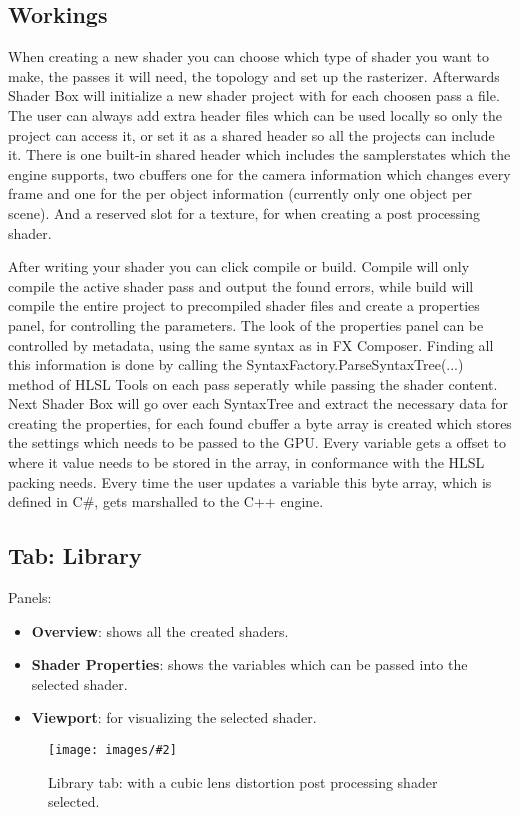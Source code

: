 \documentclass{paper}
\newlength{\imgwidth} %
\newcommand\scalegraphics[3][]
{
	\begin{figure}[H]
	\centering
	\settowidth{\imgwidth}{\texttt{[image: images/\#2]}} %
	\setlength{\imgwidth}{\minof{#1\imgwidth}{\textwidth}} %
	\texttt{[image: images/\#2]} %
	\caption{#3}
	\end{figure}
}
\begin{document}
\newpage
\subsection{Workings}
When creating a new shader you can choose which type of shader you want to make, the passes it will need, the topology and set up the rasterizer. Afterwards Shader Box will initialize a new shader project with for each choosen pass a file. The user can always add extra header files which can be used locally so only the project can access it, or set it as a shared header so all the projects can include it. There is one built-in shared header which includes the samplerstates which the engine supports, two cbuffers one for the camera information which changes every frame and one for the per object information (currently only one object per scene). And a reserved slot for a texture, for when creating a post processing shader.
\par
After writing your shader you can click compile or build. Compile will only compile the active shader pass and output the found errors, while build will compile the entire project to precompiled shader files and create a properties panel, for controlling the parameters. The look of the properties panel can be controlled by metadata, using the same syntax as in FX Composer. Finding all this information is done by calling the SyntaxFactory.ParseSyntaxTree(...) method of HLSL Tools on each pass seperatly while passing the shader content. Next Shader Box will go over each SyntaxTree and extract the necessary data for creating the properties, for each found cbuffer a byte array is created which stores the settings which needs to be passed to the GPU. Every variable gets a offset to where it value needs to be stored in the array, in conformance with the HLSL packing needs. Every time the user updates a variable this byte array, which is defined in C\#, gets marshalled to the C++ engine.

\newpage
\subsection{Tab: Library}\label{subsec:tab_l}
Panels:
\begin{itemize}
	\item \textbf{Overview}: shows all the created shaders.
	\item \textbf{Shader Properties}: shows the variables which can be passed into the selected shader.
	\item \textbf{Viewport}: for visualizing the selected shader.
\end{itemize}
\scalegraphics{Library.png}{Library tab: with a cubic lens distortion post processing shader selected.}
\end{document}
